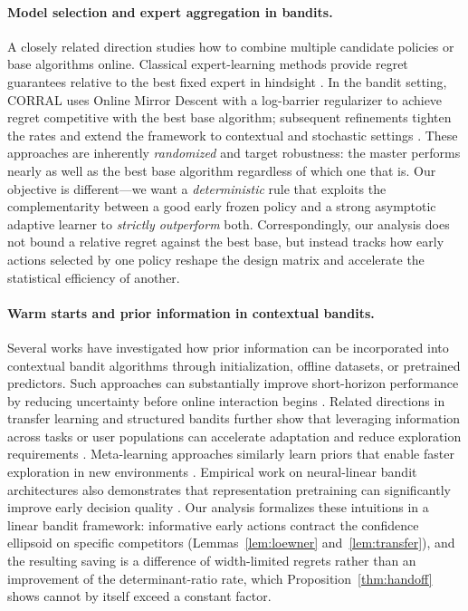 \documentclass{article}
\theoremstyle{definition}
\theoremstyle{remark}
\theoremstyle{remark}
\begin{document}
\paragraph{Model selection and expert aggregation in bandits.}
A closely related direction studies how to combine multiple candidate
policies or base algorithms online. Classical expert-learning methods provide
regret guarantees relative to the best fixed expert in hindsight
\cite{auer2002nonstochastic}. In the bandit setting, CORRAL
\cite{agarwal2017corralling} uses Online Mirror Descent with a log-barrier
regularizer to achieve regret competitive with the best base algorithm;
subsequent refinements tighten the rates and extend the framework to
contextual and stochastic settings
\cite{pacchiano2020model,marinov2021pareto,zhu2022pareto,zhu2022near,
dann2024data}. These approaches are inherently \emph{randomized} and target
robustness: the master performs nearly as well as the best base algorithm
regardless of which one that is. Our objective is different---we want a
\emph{deterministic} rule that exploits the complementarity between a good
early frozen policy and a strong asymptotic adaptive learner to
\emph{strictly outperform} both. Correspondingly, our analysis does not
bound a relative regret against the best base, but instead tracks how early
actions selected by one policy reshape the design matrix and accelerate the
statistical efficiency of another.

\paragraph{Warm starts and prior information in contextual bandits.}
Several works have investigated how prior information can be incorporated
into contextual bandit algorithms through initialization, offline datasets,
or pretrained predictors. Such approaches can substantially improve
short-horizon performance by reducing uncertainty before online interaction
begins \cite{bastani2021mostly,zhang2019warm}. Related directions in
transfer learning and structured bandits further show that leveraging
information across tasks or user populations can accelerate adaptation and
reduce exploration requirements \cite{lazaric2012transfer,gentile2014online}.
Meta-learning approaches similarly learn priors that enable faster
exploration in new environments \cite{sharaf2019meta}. Empirical work on
neural-linear bandit architectures also demonstrates that representation
pretraining can significantly improve early decision quality
\cite{riquelme2018deep}. Our analysis formalizes these intuitions in a
linear bandit framework: informative early actions contract the confidence
ellipsoid on specific competitors (Lemmas~\ref{lem:loewner}
and~\ref{lem:transfer}), and the resulting saving is a difference of
width-limited regrets rather than an improvement of the
determinant-ratio rate, which Proposition~\ref{thm:handoff} shows cannot by
itself exceed a constant factor.
\end{document}

